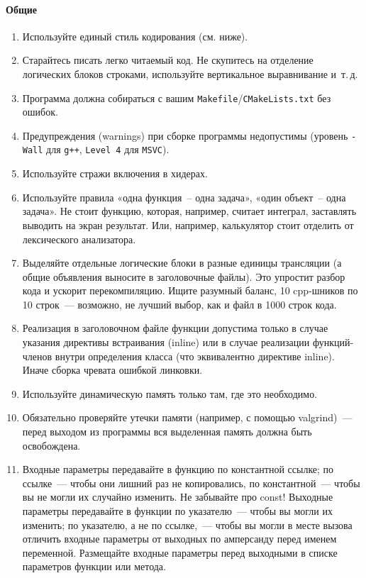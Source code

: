 \documentclass[a4paper,10pt]{article}
\begin{document}
\paragraph{Общие}
\begin{enumerate}
    \item Используйте единый стиль кодирования (см. ниже).
    \item Старайтесь писать легко читаемый код. Не скупитесь на отделение логических
        блоков строками, используйте вертикальное выравнивание и~т.\,д.
    \item Программа должна собираться с вашим {\tt Makefile}/{\tt CMakeLists.txt} без ошибок.
    \item Предупреждения (warnings) при сборке программы недопустимы
        (уровень {\tt -Wall} для {\tt g++}, {\tt Level 4} для {\tt MSVC}).
    \item Используйте стражи включения в хидерах.
    \item Используйте правила «одна функция~– одна задача», «один объект~– одна
        задача». Не стоит функцию, которая, например, считает интеграл, заставлять
        выводить на экран результат. Или, например, калькулятор стоит отделить от
        лексического анализатора.
    \item Выделяйте отдельные логические блоки в разные единицы трансляции (а общие
        объявления выносите в заголовочные файлы). Это упростит разбор кода и ускорит
        перекомпиляцию. Ищите разумный баланс, 10 cpp-шников по 10 строк~— возможно,
        не лучший выбор, как и файл в 1000 строк кода. 
    \item Реализация в заголовочном файле функции допустима только в случае указания
        директивы встраивания (inline) или в случае реализации функций-членов внутри
        определения класса (что эквивалентно директиве inline). Иначе сборка чревата
        ошибкой линковки.
    \item Используйте динамическую память только там, где это необходимо.
    \item Обязательно проверяйте утечки памяти (например, с помощью valgrind)~—
        перед выходом из программы вся выделенная память должна быть
        освобождена.
    \item Входные параметры передавайте в функцию по константной ссылке; по
        ссылке~— чтобы они лишний раз не копировались, по константной~— чтобы вы
        не могли их случайно изменить. Не забывайте про const! Выходные
        параметры передавайте в функции по указателю~— чтобы вы могли их
        изменить; по указателю, а не по ссылке,~— чтобы вы могли в месте вызова
        отличить входные параметры от выходных по амперсанду перед именем
        переменной. Размещайте входные параметры перед выходными в списке
        параметров функции или метода.  
        

\end{enumerate}
\end{document}
